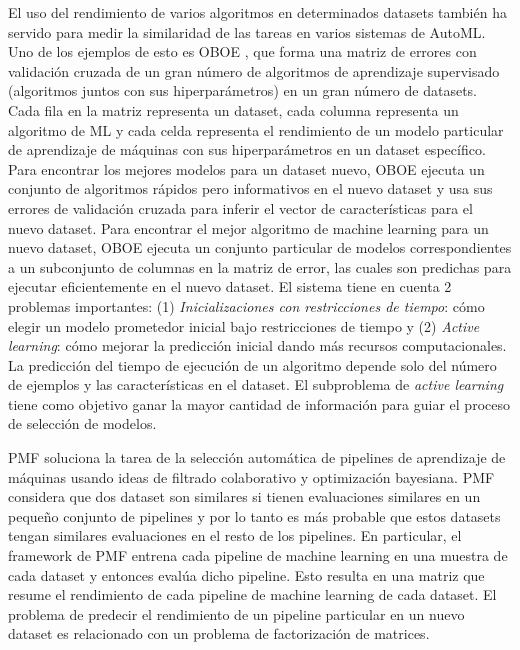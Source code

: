 El uso del rendimiento de varios algoritmos en determinados datasets también ha servido para medir la similaridad de las tareas en varios sistemas de AutoML. Uno de los ejemplos de esto es OBOE \cite{yang2018oboe}, que forma una matriz de errores con validación cruzada de un gran número de algoritmos de aprendizaje supervisado (algoritmos juntos con sus hiperparámetros) en un gran número de datasets. Cada fila  en la matriz representa un dataset, cada columna representa un algoritmo de ML y cada celda representa el rendimiento de un modelo particular de aprendizaje de máquinas con sus hiperparámetros en un dataset específico. Para encontrar los mejores modelos para un dataset nuevo, OBOE ejecuta un conjunto de algoritmos rápidos pero informativos en el nuevo dataset y usa sus errores de validación cruzada para inferir el vector de características para el nuevo dataset. Para encontrar el mejor algoritmo de machine learning para un nuevo dataset, OBOE ejecuta un conjunto particular de modelos correspondientes a un subconjunto de columnas en la matriz de error, las cuales son predichas para ejecutar eficientemente en el nuevo dataset. El sistema tiene en cuenta 2 problemas importantes: (1) \textit{Inicializaciones con restricciones de tiempo}: cómo elegir un modelo prometedor inicial bajo restricciones de tiempo y (2) \textit{Active learning}: cómo mejorar la predicción inicial dando más recursos computacionales. La predicción del tiempo de ejecución de un algoritmo depende solo del número de ejemplos y las características en el dataset. El subproblema de \textit{active learning} tiene como objetivo ganar la mayor cantidad de información para guiar el proceso de selección de modelos.

PMF \cite{fusi2018advances} soluciona la tarea de la selección automática de pipelines de aprendizaje de máquinas usando ideas de filtrado colaborativo y optimización bayesiana. PMF considera que dos dataset son similares si tienen evaluaciones similares en un pequeño conjunto de pipelines y por lo tanto es más probable que estos datasets tengan similares evaluaciones en el resto de los pipelines. En particular, el framework de PMF entrena cada pipeline de machine learning en una muestra de cada dataset y entonces evalúa dicho pipeline. Esto resulta en una matriz que resume el rendimiento de cada pipeline de machine learning de cada dataset. El problema de predecir el rendimiento de un pipeline particular en un nuevo dataset es relacionado con un problema de factorización de matrices.

